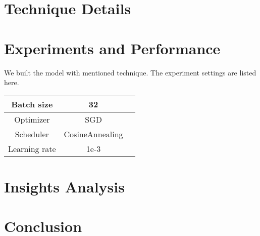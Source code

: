 \documentclass[10pt,twocolumn,letterpaper]{article}
\begin{document}
\section{Technique Details}

\section{Experiments and Performance}

We built the model with mentioned technique.
The experiment settings are listed here.


\begin{table}[h]
   \begin{center}
   \begin{tabular}{|c|c| p{5cm}|}  
   \hline  
   Batch size & 32 \\
   \hline  
   Optimizer & SGD \\
   \hline  
   Scheduler & CosineAnnealing \\  
   \hline
   Learning rate & 1e-3 \\
   \hline
   \end{tabular}  
   \end{center}  
\end{table}



\section{Insights Analysis}

\section{Conclusion}

{\small


}
\end{document}
